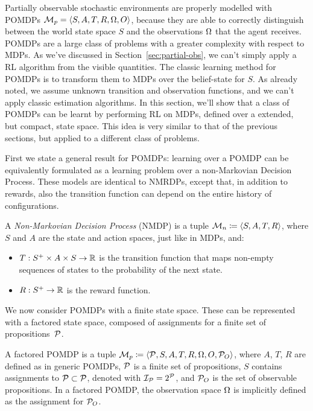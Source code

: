 Partially observable stochastic environments are properly modelled with POMDPs
$\mathcal{M}_p = \langle S, A, T, R, \Omega, O\rangle$, because they are able to
correctly distinguish between the world state space $S$ and the observations
$\Omega$ that the agent receives. POMDPs are a large class of problems with a
greater complexity with respect to MDPs. As we've discussed in
Section~\ref{sec:partial-obs}, we can't simply apply a RL algorithm from the
visible quantities. The classic learning method for POMDPs is to transform
them to MDPs over the belief-state for $S$. As already noted, we assume
unknown transition and observation functions, and we can't apply classic
estimation algorithms. In this section, we'll show that a class of POMDPs can
be learnt by performing RL on MDPs, defined over a extended, but compact,
state space. This idea is very similar to that of the previous sections, but
applied to a different class of problems.

First we state a general result for POMDPs: learning over a POMDP can be
equivalently formulated as a learning problem over a non-Markovian Decision
Process. These models are identical to NMRDPs, except that, in addition to
rewards, also the transition function can depend on the entire history of
configurations.
\begin{definition}
	A \emph{Non-Markovian Decision Process}
	(NMDP) is a tuple
	$\mathcal{M}_n \coloneqq \langle S, A, T, R \rangle$, where $S$ and $A$ are
	the state and action spaces, just like in MDPs, and:
	\begin{itemize}
		\item $T: S^+ \times A \times S \to \mathbb{R}$ is the transition function that
			maps non-empty sequences of states to the probability of the next state.
		\item $R: S^+ \to \mathbb{R}$ is the reward function.
	\end{itemize}
	\label{def:nmdp-general}
\end{definition}

We now consider POMDPs with a finite state space. These can be represented
with a factored state space, composed of assignments for a finite set of
propositions~$\mathcal{P}$.
\begin{definition}
	A factored POMDP is a tuple $\mathcal{M}_p \coloneqq \langle \mathcal{P}, S, A,
	T, R, \Omega, O, \mathcal{P}_O \rangle$, where $A$, $T$, $R$ are defined as
	in generic POMDPs, $\mathcal{P}$ is a finite set of propositions, $S$
	contains assignments to $\mathcal{P} \subset \mathcal{P}$, denoted with
	$\mathcal{I}_{\mathcal{P}} = 2^{\mathcal{P}}$, and $\mathcal{P}_O$ is the set of
	observable propositions. In a factored POMDP, the observation space $\Omega$
	is implicitly defined as the assignment for $\mathcal{P}_O$.
\end{definition}

